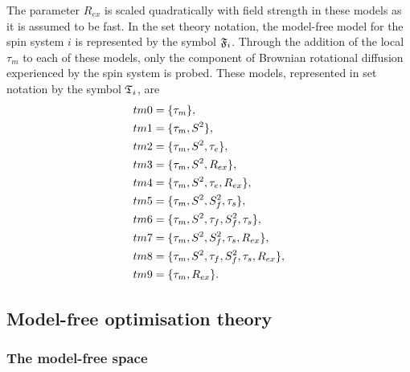 \begin{htmlonly}
\begin{htmlonly}
\noindent The parameter $R_{ex}$ is scaled quadratically with field strength in these models as it is assumed to be fast.  In the set theory notation, the model-free model for the spin system $i$ is represented by the symbol $\mathfrak{F}_i$.  Through the addition of the local $\tau_m$ to each of these models, only the component of Brownian rotational diffusion experienced by the spin system is probed.  These models, represented in set notation by the symbol $\mathfrak{T}_i$, are
\begin{subequations}
\renewcommand{\theequation}{\theparentequation .\arabic{equation}}
\addtocounter{equation}{-1}
\begin{align}
 tm0 &= \{\tau_m\},                                     \label{model: tm0} \\
 tm1 &= \{\tau_m, S^2\},                                \label{model: tm1} \\
 tm2 &= \{\tau_m, S^2, \tau_e\},                        \label{model: tm2} \\
 tm3 &= \{\tau_m, S^2, R_{ex}\},                        \label{model: tm3} \\
 tm4 &= \{\tau_m, S^2, \tau_e, R_{ex}\},                \label{model: tm4} \\
 tm5 &= \{\tau_m, S^2, S^2_f, \tau_s\},                 \label{model: tm5} \\
 tm6 &= \{\tau_m, S^2, \tau_f, S^2_f, \tau_s\},         \label{model: tm6} \\
 tm7 &= \{\tau_m, S^2, S^2_f, \tau_s, R_{ex}\},         \label{model: tm7} \\
 tm8 &= \{\tau_m, S^2, \tau_f, S^2_f, \tau_s, R_{ex}\}, \label{model: tm8} \\
 tm9 &= \{\tau_m, R_{ex}\}.                             \label{model: tm9}
\end{align}
\end{subequations}





\subsection{Model-free optimisation theory}


\subsubsection{The model-free space}


\end{htmlonly}
\end{htmlonly}
